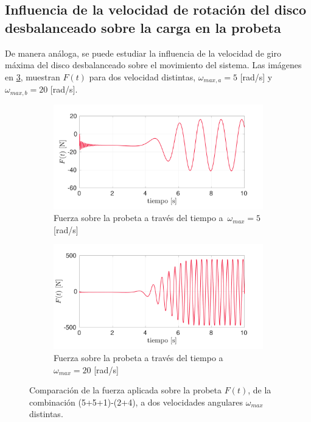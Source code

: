 \subsection{Influencia de la velocidad de rotación del disco desbalanceado sobre la carga en la probeta}

De manera análoga, se puede estudiar la influencia de la velocidad de giro máxima del disco desbalanceado sobre el movimiento del sistema. Las imágenes en \ref{fig:f_w520}, muestran $F(t)$ para dos velocidad distintas, $\omega_{max,a} = 5$ [rad/s] y $\omega_{max,b}=20$ [rad/s]. 

\begin{figure}[h]
\centering
	\begin{subfigure}{1\linewidth}
		\centering
		\includegraphics[width=\linewidth, trim={0cm 0cm 2cm 0cm},clip]{Imagenes/f_w5.pdf}
		\caption{Fuerza sobre la probeta a través del tiempo a $\,\omega_{max}=5$ [rad/s]}
		\label{fig:f_w5}
	\end{subfigure}
	\begin{subfigure}{1\linewidth}
		\centering
		\includegraphics[width=\linewidth, trim={0cm 0cm 2cm 0cm},clip]{Imagenes/f_w20.pdf}
		\caption{Fuerza sobre la probeta a través del tiempo a $\omega_{max}=20$ [rad/s]}
		\label{fig:f_w20}
	\end{subfigure}
\caption{Comparación de la fuerza aplicada sobre la probeta $F(t)$, de la combinación (5+5+1)-(2+4), a dos velocidades angulares $\omega_{max}$ distintas.}
\label{fig:f_w520}
\end{figure}


